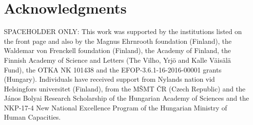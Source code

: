 \documentclass[doublecol]{epl/epl2}
\begin{document}
\section{Acknowledgments}

SPACEHOLDER ONLY: This work was supported by the institutions listed on the front page and also by the Magnus Ehrnrooth foundation (Finland), the Waldemar von Frenckell foundation (Finland), the Academy of Finland, the Finnish Academy of Science and Letters (The Vilho, Yrj\"o and Kalle V\"ais\"al\"a Fund), the OTKA NK 101438 and the EFOP-3.6.1-16-2016-00001 grants (Hungary). Individuals have received support from Nylands nation vid Helsingfors universitet (Finland), from the M\v SMT \v CR (Czech Republic) and the J\'anos Bolyai Research Scholarship of the Hungarian Academy of Sciences and the NKP-17-4 New National Excellence Program of the Hungarian Ministry of Human Capacities.





\iffalse
\begin{thebibliography}{99}

\bibitem{epl95}
	\Name{Antchev G.~\etal{}~(TOTEM Collaboration)}
	\REVIEW{Europhys.~Lett.}{95}{2011}{41001}

\end{thebibliography}
\fi
\end{document}

